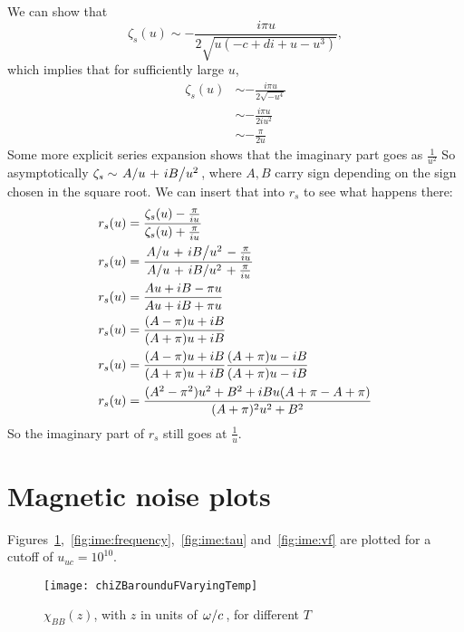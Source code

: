 \documentclass[../main.tex]{subfiles}
\begin{document}
	We can show that
	\begin{equation}
		\zeta_s(u) \sim - \frac{i \pi u}{2 \sqrt{u\left( - c + di + u - u^3 \right)}},
	\end{equation}
	which implies that for sufficiently large $u$,
	\begin{align}
		\zeta_s(u) &\sim - \frac{i \pi u}{2 \sqrt{- u^4}} \\
		&\sim - \frac{i \pi u}{2 i u^2} \\
		&\sim - \frac{\pi }{2 u}
	\end{align}
	Some more explicit series expansion shows that the imaginary part goes as $\frac{1}{u^2}$
	So asymptotically $\zeta_s \sim \flatfrac{A}{u} + \flatfrac{i B}{u^2}$, where $A, B$ carry sign depending on the sign chosen in the square root.
	We can insert that into $r_s$ to see what happens there:
	\begin{align}
		r_s(u) &= \frac{\zeta_s(u) - \frac{\pi}{iu }}{\zeta_s(u) + \frac{\pi}{iu}} \\
		r_s(u) &= \frac{\flatfrac{A}{u} + \flatfrac{i B}{u^2} - \frac{\pi}{iu}}{\flatfrac{A}{u} + \flatfrac{i B}{u^2} + \frac{\pi}{iu}} \\
		r_s(u) &= \frac{A u + i B - \pi u}{A u + i B + \pi u} \\
		r_s(u) &= \frac{(A - \pi) u + i B}{(A + \pi)u + i B } \\
		r_s(u) &= \frac{(A - \pi) u + i B}{(A + \pi)u + i B } \frac{{(A + \pi)u - i B }}{{(A + \pi)u - i B }} \\
		r_s(u) &= \frac{(A^2 - \pi^2) u^2 + B^2  + i B u(A + \pi - A + \pi)}{(A + \pi)^2 u^2 + B^2 }
	\end{align}
	So the imaginary part of $r_s$ still goes at $\frac{1}{u}$.


	\section{Magnetic noise plots} \label{sec:ime:plots}

	Figures~\ref{fig:ime:temp},~\ref{fig:ime:frequency},~\ref{fig:ime:tau} and~\ref{fig:ime:vf} are plotted for a cutoff of $u_{uc} = 10^{10}$.

	\begin{figure}[htp]
		\centering
		\texttt{[image: chiZBarounduFVaryingTemp]}
		\caption{$\chi_{BB}(z)$, with $z$ in units of $\flatfrac{\omega}{c}$, for different $T$} \label{fig:ime:temp}
	\end{figure}
\end{document}
